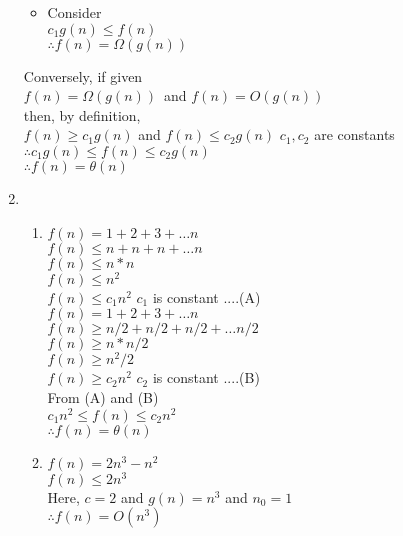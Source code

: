 \documentclass[12pt, a4paper]{article}
\begin{document}
\begin{enumerate}[label=(\alph*)]
\begin{itemize}
			\item Consider \\$c_1 g(n) \leq f(n)$  \\
			$\therefore f(n) = \Omega(g(n))$\\
		\end{itemize}
		
		
		Conversely, if given \\$f(n) = \Omega(g(n))$\ and 
		$f(n)=O(g(n))$\\
		then, by definition,\\
		$f(n) \geq c_1 g(n)$ and $f(n) \leq c_2 g(n)$ \hspace{2cm}$c_1,c_2$ are constants\\
		$\therefore c_1 g(n) \leq f(n) \leq c_2 g(n)$\\
		$\therefore f(n)=\theta(n)$\\
		

		\item 
		\begin{enumerate}[label=(\roman*)]
			\item $f(n)=1+2+3+\dots n$\\ 
			$f(n) \leq n+n+n+\dots n$\\
			$f(n) \leq n*n$\\
			$f(n) \leq n^2$\\
			$f(n) \leq c_1 n^2$  \hspace{2cm} $c_1$ is constant\hspace{2cm} ....(A)\\
			
			$f(n)=1+2+3+\dots n$\\ 
			$f(n) \geq n/2+n/2+n/2+\dots n/2$\\
			$f(n) \geq n*n/2$\\
			$f(n) \geq n^2/2$\\
			$f(n) \geq c_2 n^2$  \hspace{2cm} $c_2$ is constant\hspace{2cm} ....(B)\\
			
			From (A) and (B)\\
			$c_1 n^2 \leq f(n) \leq c_2 n^2$\\
			\boldmath $\therefore f(n) = \theta(n) $\unboldmath\\
			
			\item $f(n) = 2n^3-n^2$\\
			$f(n) \leq 2n^3$\\
			Here, $c=2$ and $g(n)=n^3$ and $n_0=1$\\
			\boldmath$\therefore f(n)=O(n^3)$\unboldmath\\
			

\end{enumerate}
\end{enumerate}
\end{document}
